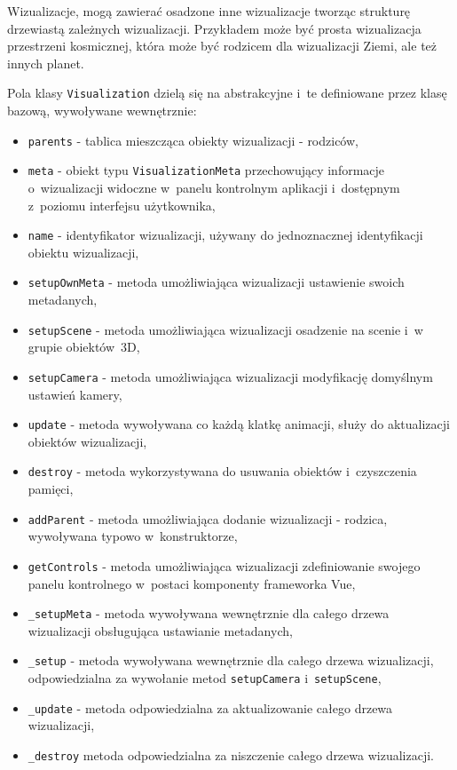 Wizualizacje, mogą zawierać osadzone inne wizualizacje tworząc strukturę drzewiastą zależnych wizualizacji. Przykładem może być prosta wizualizacja przestrzeni kosmicznej, która może być rodzicem dla wizualizacji Ziemi, ale też innych planet.
\begin{samepage}
    Pola klasy \texttt{Visualization} dzielą się na abstrakcyjne i~te definiowane przez klasę bazową, wywoływane wewnętrznie:


    \begin{itemize}
        \item \texttt{parents} - tablica mieszcząca obiekty wizualizacji - rodziców,
        \item \texttt{meta} - obiekt typu \texttt{VisualizationMeta} przechowujący informacje o~wizualizacji widoczne w~panelu kontrolnym aplikacji i~dostępnym z~poziomu interfejsu użytkownika,
        \item \texttt{name} - identyfikator wizualizacji, używany do jednoznacznej identyfikacji obiektu wizualizacji,
        \item \texttt{setupOwnMeta} - metoda umożliwiająca wizualizacji ustawienie swoich metadanych,
        \item \texttt{setupScene} - metoda umożliwiająca wizualizacji osadzenie na scenie i~w grupie obiektów~3D,
        \item \texttt{setupCamera} - metoda umożliwiająca wizualizacji modyfikację domyślnym ustawień kamery,
        \item \texttt{update} - metoda wywoływana co każdą klatkę animacji, służy do aktualizacji obiektów wizualizacji,
        \item \texttt{destroy} - metoda wykorzystywana do usuwania obiektów i~czyszczenia pamięci,
        \item \texttt{addParent} - metoda umożliwiająca dodanie wizualizacji - rodzica, wywoływana typowo w~konstruktorze,
        \item \texttt{getControls} - metoda umożliwiająca wizualizacji zdefiniowanie swojego panelu kontrolnego w~postaci komponenty frameworka Vue,
        \item \texttt{\_setupMeta} - metoda wywoływana wewnętrznie dla całego drzewa wizualizacji obsługująca ustawianie metadanych,
        \item \texttt{\_setup} - metoda wywoływana wewnętrznie dla całego drzewa wizualizacji, odpowiedzialna za wywołanie metod \texttt{setupCamera} i~\texttt{setupScene},
        \item \texttt{\_update} - metoda odpowiedzialna za aktualizowanie całego drzewa wizualizacji,
        \item \texttt{\_destroy} metoda odpowiedzialna za niszczenie całego drzewa wizualizacji.
    \end{itemize}
\end{samepage}

